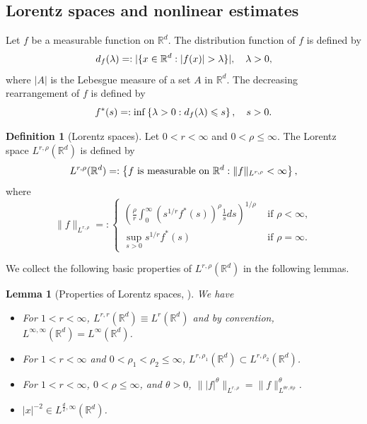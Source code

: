 \documentclass[reqno,11pt]{amsart}
\theoremstyle{plain}
\newtheorem{lemma}[theorem]{Lemma}
\theoremstyle{definition}
\newtheorem{definition}[theorem]{Definition}
\numberwithin{equation}{section}
\numberwithin{theorem}{section}
\def\leq{\leqslant}
\begin{document}
 
\subsection{Lorentz spaces and  nonlinear estimates}\label{S:2.2}
Let $f$ be a measurable function on $\mathbb{R}^d$. The distribution function of $f$ is defined by
\begin{equation}
d_f(\lambda)=: |\{x\in \mathbb{R}^d : |f(x)|>\lambda\}|, \quad \lambda>0,\notag
\end{equation}
where $|A|$ is the Lebesgue measure of a set $A$ in $\mathbb{R}^d$. The decreasing rearrangement of $f$ is defined by
\begin{equation}
f^*(s)=: \inf \left\{ \lambda>0 : d_f(\lambda)\leq s\right\}, \quad s>0.\notag
\end{equation}

\begin{definition}[Lorentz spaces] 
Let $0<r<\infty$ and $0<\rho\leq \infty$. The Lorentz space $L^{r,\rho}(\mathbb{R}^d)$ is defined by
\begin{equation}
L^{r,\rho}(\mathbb{R}^d)=: \left\{ f \text{ is measurable on } \mathbb{R}^d : \|f\|_{L^{r,\rho}}<\infty\right\}, \notag
\end{equation}
where
\[\|f\|_{L^{r,\rho}}=: \left\{
\begin{array}{cl}
( \frac{\rho}{r} \int_0^\infty (s^{1/r} f^*(s))^\rho \frac{1}{s}ds)^{1/\rho} &\text{ if } \rho <\infty, \\
\sup_{s>0} s^{1/r} f^*(s) &\text{ if } \rho=\infty.
\end{array}\right.\]
\end{definition}

We collect the following basic properties of $L^{r,\rho}(\mathbb{R}^d)$ in the following lemmas.
\begin{lemma}[Properties of Lorentz spaces, \cite{ONeil}] \label{basicp} We have

\begin{itemize}
\item[$(i)$] For $1<r<\infty$, $L^{r,r}(\mathbb{R}^d) \equiv L^r(\mathbb{R}^d)$ and by convention, $L^{\infty,\infty}(\mathbb{R}^d)= L^\infty(\mathbb{R}^d)$.

\item[$(ii)$] For $1<r<\infty$ and $0<\rho_1<\rho_2\leq \infty$, $L^{r,\rho_1}(\mathbb{R}^d)\subset L^{r,\rho_2}(\mathbb{R}^d)$. 
		
\item[$(iii)$] For $1<r<\infty$, $0<\rho \leq \infty$, and $\theta>0$, $\||f|^\theta\|_{L^{r,\rho}} = \|f\|^\theta_{L^{\theta r, \theta \rho}}$.

\item[$(iv)$]  $|x|^{-2} \in L^{\frac{d}{2},\infty}(\mathbb{R}^d)$.
\end{itemize}
\end{lemma}
\end{document}

